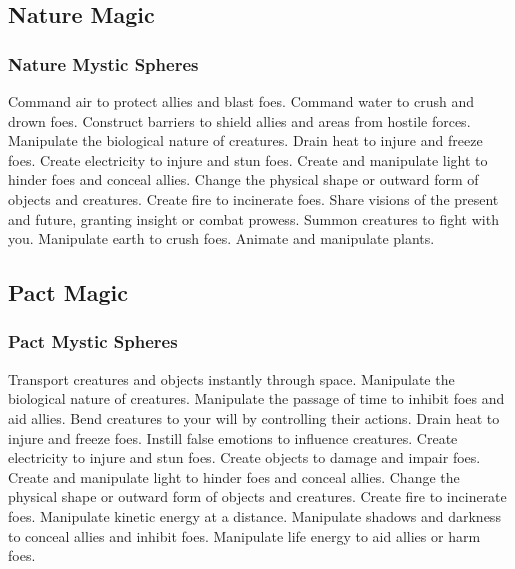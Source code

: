 \small
\subsection{Nature Magic}\label{Nature Magic}
\subsubsection{Nature Mystic Spheres}\label{Nature Mystic Spheres}
\begin{spelllist}
 Command air to protect allies and blast foes.
 Command water to crush and drown foes.
 Construct barriers to shield allies and areas from hostile forces.
 Manipulate the biological nature of creatures.
 Drain heat to injure and freeze foes.
 Create electricity to injure and stun foes.
 Create and manipulate light to hinder foes and conceal allies.
 Change the physical shape or outward form of objects and creatures.
 Create fire to incinerate foes.
 Share visions of the present and future, granting insight or combat prowess.
 Summon creatures to fight with you.
 Manipulate earth to crush foes.
 Animate and manipulate plants.
\end{spelllist}



\small
\subsection{Pact Magic}\label{Pact Magic}
\subsubsection{Pact Mystic Spheres}\label{Pact Mystic Spheres}
\begin{spelllist}
 Transport creatures and objects instantly through space.
 Manipulate the biological nature of creatures.
 Manipulate the passage of time to inhibit foes and aid allies.
 Bend creatures to your will by controlling their actions.
 Drain heat to injure and freeze foes.
 Instill false emotions to influence creatures.
 Create electricity to injure and stun foes.
 Create objects to damage and impair foes.
 Create and manipulate light to hinder foes and conceal allies.
 Change the physical shape or outward form of objects and creatures.
 Create fire to incinerate foes.
 Manipulate kinetic energy at a distance.
 Manipulate shadows and darkness to conceal allies and inhibit foes.
 Manipulate life energy to aid allies or harm foes.
\end{spelllist}
